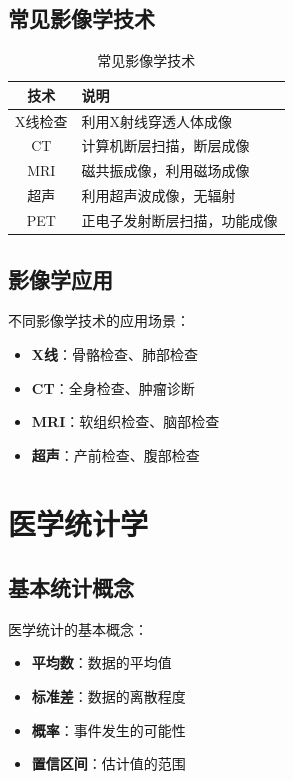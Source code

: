 \documentclass[12pt,UTF8]{ctexbook}
\begin{document}
\section{常见影像学技术}
\label{sec:imaging_techniques}

\begin{table}[htbp]
    \centering
    \caption{常见影像学技术}
    \begin{tabular}{|c|p{8cm}|}
        \hline
        \textbf{技术} & \textbf{说明} \\
        \hline
        X线检查 & 利用X射线穿透人体成像 \\
        \hline
        CT & 计算机断层扫描，断层成像 \\
        \hline
        MRI & 磁共振成像，利用磁场成像 \\
        \hline
        超声 & 利用超声波成像，无辐射 \\
        \hline
        PET & 正电子发射断层扫描，功能成像 \\
        \hline
    \end{tabular}
\end{table}

\section{影像学应用}
\label{sec:imaging_applications}

不同影像学技术的应用场景：
\begin{itemize}
    \item \textbf{X线}：骨骼检查、肺部检查
    \item \textbf{CT}：全身检查、肿瘤诊断
    \item \textbf{MRI}：软组织检查、脑部检查
    \item \textbf{超声}：产前检查、腹部检查
\end{itemize}

\chapter{医学统计学}
\label{chap:medical_statistics}

\section{基本统计概念}
\label{sec:basic_statistics}

医学统计的基本概念：
\begin{itemize}
    \item \textbf{平均数}：数据的平均值
    \item \textbf{标准差}：数据的离散程度
    \item \textbf{概率}：事件发生的可能性
    \item \textbf{置信区间}：估计值的范围
\end{itemize}
\end{document}
